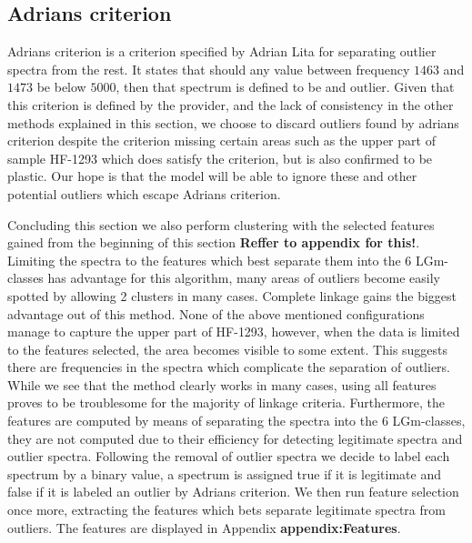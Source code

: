 \subsection{Adrians criterion}

Adrians criterion is a criterion specified by Adrian Lita for separating outlier spectra from the rest. It states that should any value between frequency $1463$ and $1473$ be below $5000$, then that spectrum is defined to be and outlier. Given that this criterion is defined by the provider, and the lack of consistency in the other methods explained in this section, we choose to discard outliers found by adrians criterion despite the criterion missing certain areas such as the upper part of sample HF-1293 which does satisfy the criterion, but is also confirmed to be plastic. Our hope is that the model will be able to ignore these and other potential outliers which escape Adrians criterion.


Concluding this section we also perform clustering with the selected features gained from the beginning of this section \textbf{Reffer to appendix for this!}. Limiting the spectra to the features which best separate them into the 6 LGm-classes has advantage for this algorithm, many areas of outliers become easily spotted by allowing 2 clusters in many cases. Complete linkage gains the biggest advantage out of this method. None of the above mentioned configurations manage to capture the upper part of HF-1293, however, when the data is limited to the features selected, the area becomes visible to some extent. This suggests there are frequencies in the spectra which complicate the separation of outliers. While we see that the method clearly works in many cases, using all features proves to be troublesome for the majority of linkage criteria. Furthermore, the features are computed by means of separating the spectra into the 6 LGm-classes, they are not computed due to their efficiency for detecting legitimate spectra and outlier spectra. Following the removal of outlier spectra we decide to label each spectrum by a binary value, a spectrum is assigned true if it is legitimate and false if it is labeled an outlier by Adrians criterion. We then run feature selection once more, extracting the features which bets separate legitimate spectra from outliers. The features are displayed in Appendix \textbf{appendix:Features}.